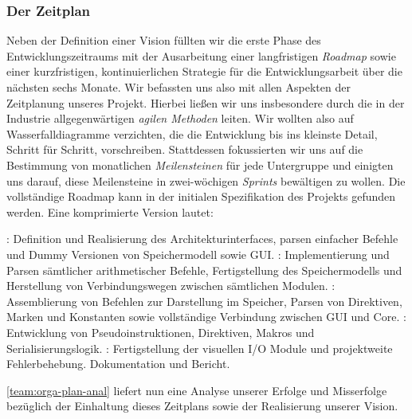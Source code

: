 
\subsubsection{Der Zeitplan}
\label{team:orga-plan-time}

Neben der Definition einer Vision füllten wir die erste Phase des
Entwicklungszeitraums mit der Ausarbeitung einer langfristigen \emph{Roadmap}
sowie einer kurzfristigen, kontinuierlichen Strategie für die Entwicklungsarbeit
über die nächsten sechs Monate. Wir befassten uns also mit allen Aspekten der
Zeitplanung unseres Projekt. Hierbei ließen wir uns insbesondere durch die in
der Industrie allgegenwärtigen \emph{agilen Methoden} leiten. Wir wollten also
auf Wasserfalldiagramme verzichten, die die Entwicklung bis ins kleinste Detail,
Schritt für Schritt, vorschreiben. Stattdessen fokussierten wir uns auf die
Bestimmung von monatlichen \emph{Meilensteinen} für jede Untergruppe und
einigten uns darauf, diese Meilensteine in zwei-wöchigen \emph{Sprints}
bewältigen zu wollen. Die vollständige Roadmap kann in der initialen
Spezifikation des Projekts gefunden werden. Eine komprimierte Version lautet:

\begin{itemize}
  : Definition und Realisierung des Architekturinterfaces, parsen einfacher Befehle und Dummy Versionen von Speichermodell sowie GUI.
  : Implementierung und Parsen sämtlicher arithmetischer Befehle, Fertigstellung des Speichermodells und Herstellung von Verbindungswegen zwischen sämtlichen Modulen.
  : Assemblierung von Befehlen zur Darstellung im Speicher, Parsen von Direktiven, Marken und Konstanten sowie vollständige Verbindung zwischen GUI und Core.
  : Entwicklung von Pseudoinstruktionen, Direktiven, Makros und Serialisierungslogik.
  : Fertigstellung der visuellen I/O Module und projektweite Fehlerbehebung.
   Dokumentation und Bericht.
\end{itemize}

\autoref{team:orga-plan-anal} liefert nun eine Analyse unserer Erfolge und Misserfolge bezüglich der Einhaltung dieses Zeitplans sowie der Realisierung unserer Vision.
